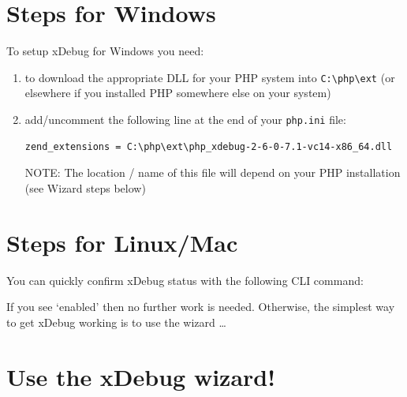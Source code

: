 \documentclass[a4paperpaper,openright]{book}
\newenvironment{Shaded}{}{}
\newcommand{\ExtensionTok}[1]{#1}
\newcommand{\FunctionTok}[1]{\textcolor[rgb]{0.02,0.16,0.49}{#1}}
\newcommand{\KeywordTok}[1]{\textcolor[rgb]{0.00,0.44,0.13}{\textbf{#1}}}
\newcommand{\NormalTok}[1]{#1}
\newcommand{\OperatorTok}[1]{\textcolor[rgb]{0.40,0.40,0.40}{#1}}
\newcommand{\StringTok}[1]{\textcolor[rgb]{0.25,0.44,0.63}{#1}}
\begin{document}
\hypertarget{steps-for-windows}{%
\section{Steps for Windows}\label{steps-for-windows}}

To setup xDebug for Windows you need:

\begin{enumerate}
\def\labelenumi{\arabic{enumi}.}
\item
  to download the appropriate DLL for your PHP system into
  \texttt{C:\textbackslash{}php\textbackslash{}ext} (or elsewhere if you
  installed PHP somewhere else on your system)
\item
  add/uncomment the following line at the end of your \texttt{php.ini}
  file:

\begin{verbatim}
zend_extensions = C:\php\ext\php_xdebug-2-6-0-7.1-vc14-x86_64.dll
\end{verbatim}

  NOTE: The location / name of this file will depend on your PHP
  installation (see Wizard steps below)
\end{enumerate}

\hypertarget{steps-for-linuxmac}{%
\section{Steps for Linux/Mac}\label{steps-for-linuxmac}}

You can quickly confirm xDebug status with the following CLI command:

\begin{Shaded}
\end{Shaded}

If you see `enabled' then no further work is needed. Otherwise, the
simplest way to get xDebug working is to use the wizard \ldots{}

\hypertarget{use-the-xdebug-wizard}{%
\section{Use the xDebug wizard!}\label{use-the-xdebug-wizard}}
\end{document}
